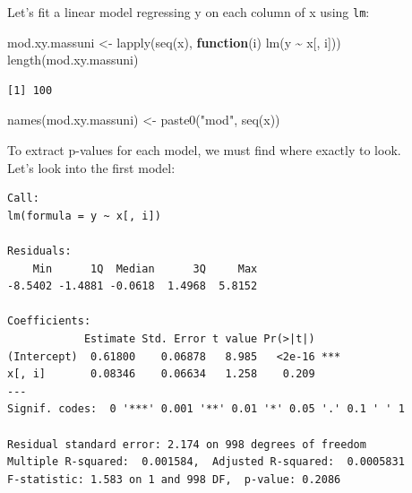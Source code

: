 \documentclass[
]{book}
\newenvironment{Shaded}{\begin{snugshade}}{\end{snugshade}}
\newcommand{\ControlFlowTok}[1]{\textcolor[rgb]{0.13,0.29,0.53}{\textbf{#1}}}
\newcommand{\FunctionTok}[1]{\textcolor[rgb]{0.00,0.00,0.00}{#1}}
\newcommand{\NormalTok}[1]{#1}
\newcommand{\OtherTok}[1]{\textcolor[rgb]{0.56,0.35,0.01}{#1}}
\newcommand{\SpecialCharTok}[1]{\textcolor[rgb]{0.00,0.00,0.00}{#1}}
\newcommand{\StringTok}[1]{\textcolor[rgb]{0.31,0.60,0.02}{#1}}
\begin{document}
Let's fit a linear model regressing y on each column of x using \texttt{lm}:

\begin{Shaded}
\begin{Highlighting}[]
\NormalTok{mod.xy.massuni }\OtherTok{\textless{}{-}} \FunctionTok{lapply}\NormalTok{(}\FunctionTok{seq}\NormalTok{(x), }\ControlFlowTok{function}\NormalTok{(i) }\FunctionTok{lm}\NormalTok{(y }\SpecialCharTok{\textasciitilde{}}\NormalTok{ x[, i]))}
\FunctionTok{length}\NormalTok{(mod.xy.massuni)}
\end{Highlighting}
\end{Shaded}

\begin{verbatim}
[1] 100
\end{verbatim}

\begin{Shaded}
\begin{Highlighting}[]
\FunctionTok{names}\NormalTok{(mod.xy.massuni) }\OtherTok{\textless{}{-}} \FunctionTok{paste0}\NormalTok{(}\StringTok{"mod"}\NormalTok{, }\FunctionTok{seq}\NormalTok{(x))}
\end{Highlighting}
\end{Shaded}

To extract p-values for each model, we must find where exactly to look.\\
Let's look into the first model:

\begin{Shaded}
\end{Shaded}

\begin{verbatim}
Call:
lm(formula = y ~ x[, i])

Residuals:
    Min      1Q  Median      3Q     Max 
-8.5402 -1.4881 -0.0618  1.4968  5.8152 

Coefficients:
            Estimate Std. Error t value Pr(>|t|)    
(Intercept)  0.61800    0.06878   8.985   <2e-16 ***
x[, i]       0.08346    0.06634   1.258    0.209    
---
Signif. codes:  0 '***' 0.001 '**' 0.01 '*' 0.05 '.' 0.1 ' ' 1

Residual standard error: 2.174 on 998 degrees of freedom
Multiple R-squared:  0.001584,  Adjusted R-squared:  0.0005831 
F-statistic: 1.583 on 1 and 998 DF,  p-value: 0.2086
\end{verbatim}
\end{document}
